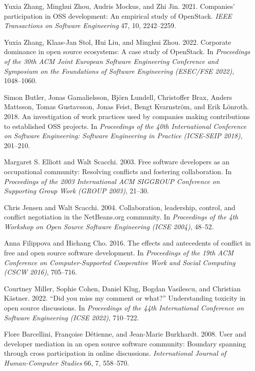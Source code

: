 Yuxia Zhang, Minghui Zhou, Audris Mockus, and Zhi Jin. 2021. Companies' participation in OSS development: An empirical study of OpenStack. \emph{IEEE Transactions on Software Engineering} 47, 10, 2242--2259.

Yuxia Zhang, Klaas-Jan Stol, Hui Liu, and Minghui Zhou. 2022. Corporate dominance in open source ecosystems: A case study of OpenStack. In \emph{Proceedings of the 30th ACM Joint European Software Engineering Conference and Symposium on the Foundations of Software Engineering (ESEC/FSE 2022)}, 1048--1060.

Simon Butler, Jonas Gamalielsson, Bj\"orn Lundell, Christoffer Brax, Anders Mattsson, Tomas Gustavsson, Jonas Feist, Bengt Kvarnstr\"om, and Erik L\"onroth. 2018. An investigation of work practices used by companies making contributions to established OSS projects. In \emph{Proceedings of the 40th International Conference on Software Engineering: Software Engineering in Practice (ICSE-SEIP 2018)}, 201--210.

Margaret S. Elliott and Walt Scacchi. 2003. Free software developers as an occupational community: Resolving conflicts and fostering collaboration. In \emph{Proceedings of the 2003 International ACM SIGGROUP Conference on Supporting Group Work (GROUP 2003)}, 21--30.

Chris Jensen and Walt Scacchi. 2004. Collaboration, leadership, control, and conflict negotiation in the NetBeans.org community. In \emph{Proceedings of the 4th Workshop on Open Source Software Engineering (ICSE 2004)}, 48--52.

Anna Filippova and Hichang Cho. 2016. The effects and antecedents of conflict in free and open source software development. In \emph{Proceedings of the 19th ACM Conference on Computer-Supported Cooperative Work and Social Computing (CSCW 2016)}, 705--716.

Courtney Miller, Sophie Cohen, Daniel Klug, Bogdan Vasilescu, and Christian K\"astner. 2022. ``Did you miss my comment or what?'' Understanding toxicity in open source discussions. In \emph{Proceedings of the 44th International Conference on Software Engineering (ICSE 2022)}, 710--722.

Flore Barcellini, Fran\c{c}oise D\'etienne, and Jean-Marie Burkhardt. 2008. User and developer mediation in an open source software community: Boundary spanning through cross participation in online discussions. \emph{International Journal of Human-Computer Studies} 66, 7, 558--570.

